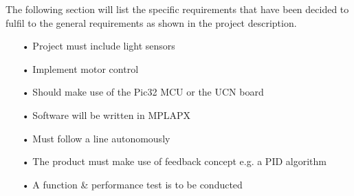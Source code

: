 The following section will list the specific requirements that have been decided to fulfil to the general requirements as shown in the project description.
\begin{enumerate}
	\item[•]Project must include light sensors
	\item[•]Implement motor control				
	\item[•]Should make use of the Pic32 MCU or the UCN board
	\item[•]Software will be written in MPLAPX
	\item[•]Must follow a line autonomously
	\item[•]The product must make use of feedback concept e.g. a PID algorithm
\item[•]A function \& performance test is to be conducted
\end{enumerate}
